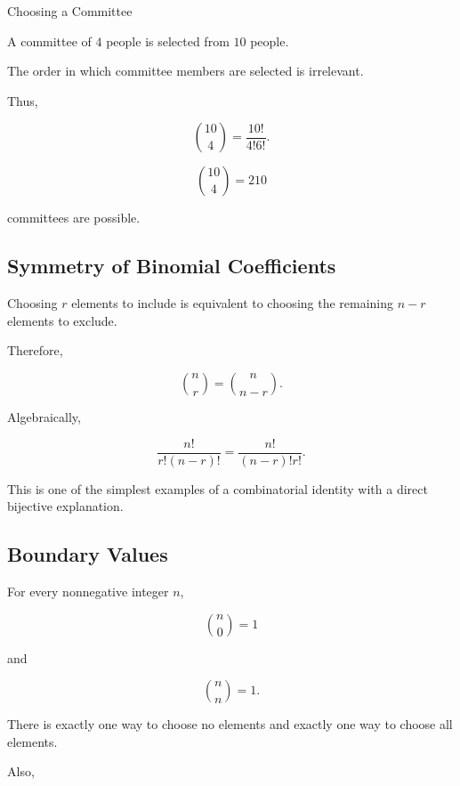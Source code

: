 \begin{workedexamplebox}{Choosing a Committee}

A committee of \(4\) people is selected from \(10\) people.

The order in which committee members are selected is irrelevant.

Thus,

\[
\binom{10}{4}
=
\frac{10!}{4!6!}.
\]

\begin{answerbox}
\[
\boxed{
\binom{10}{4}=210
}
\]

committees are possible.
\end{answerbox}

\end{workedexamplebox}

\subsection{Symmetry of Binomial Coefficients}
\label{subsec:binomial-symmetry}

Choosing \(r\) elements to include is equivalent to choosing the
remaining \(n-r\) elements to exclude.

Therefore,

\[
\boxed{
\binom{n}{r}
=
\binom{n}{n-r}.
}
\]

Algebraically,

\[
\frac{n!}{r!(n-r)!}
=
\frac{n!}{(n-r)!r!}.
\]

This is one of the simplest examples of a combinatorial identity with a
direct bijective explanation.

\subsection{Boundary Values}
\label{subsec:binomial-boundary-values}

For every nonnegative integer \(n\),

\[
\boxed{
\binom{n}{0}=1
}
\]

and

\[
\boxed{
\binom{n}{n}=1.
}
\]

There is exactly one way to choose no elements and exactly one way to
choose all elements.

Also,


